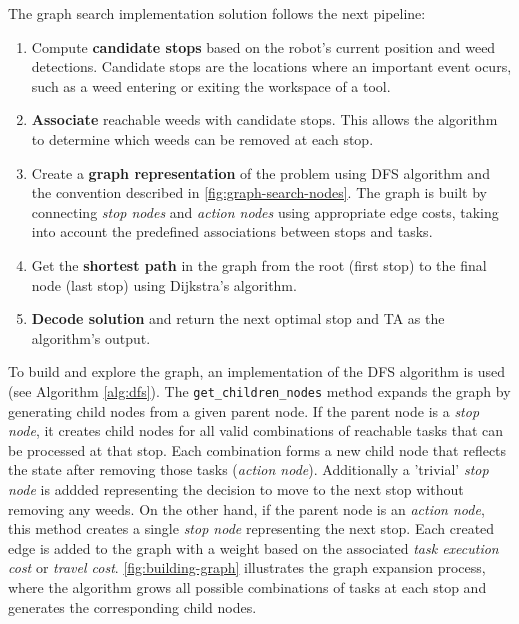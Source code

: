 The graph search implementation solution follows the next pipeline:
\begin{enumerate}
    \item Compute \textbf{candidate stops} based on the robot's current position and weed detections. Candidate stops are the locations where an important event ocurs, such as a weed entering or exiting the workspace of a tool.
    \item \textbf{Associate} reachable weeds with candidate stops. This allows the algorithm to determine which weeds can be removed at each stop.
    \item Create a \textbf{graph representation} of the problem using \ac{DFS} algorithm and the convention described in \autoref{fig:graph-search-nodes}. The graph is built by connecting \textit{stop nodes} and \textit{action nodes} using appropriate edge costs, taking into account the predefined associations between stops and tasks.
    \item Get the \textbf{shortest path} in the graph from the root (first stop) to the final node (last stop) using Dijkstra's algorithm.
    \item \textbf{Decode solution} and return the next optimal stop and \ac{TA} as the algorithm's output.
\end{enumerate}


To build and explore the graph, an implementation of the \ac{DFS} algorithm is used (see Algorithm \ref{alg:dfs}). The \texttt{get\_children\_nodes} method expands the graph by generating child nodes from a given parent node. If the parent node is a \textit{stop node}, it creates child nodes for all valid combinations of reachable tasks that can be processed at that stop. Each combination forms a new child node that reflects the state after removing those tasks (\textit{action node}). Additionally a 'trivial' \textit{stop node} is addded representing the decision to move to the next stop without removing any weeds. On the other hand, if the parent node is an \textit{action node}, this method creates a single \textit{stop node} representing the next stop. Each created edge is added to the graph with a weight based on the associated \textit{task execution cost} or \textit{travel cost}. \autoref{fig:building-graph} illustrates the graph expansion process, where the algorithm grows all possible combinations of tasks at each stop and generates the corresponding child nodes.

